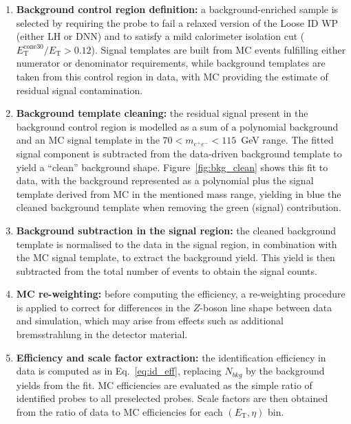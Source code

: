 \begin{enumerate}
    \item \textbf{Background control region definition:} a background-enriched sample is selected by requiring the probe to fail a relaxed version of the Loose ID WP (either LH or DNN) and to satisfy a mild calorimeter isolation cut ($E_{\mathrm{T}}^{\mathrm{cone30}}/E_{\mathrm{T}}>0.12$). Signal templates are built from MC events fulfilling either numerator or denominator requirements, while background templates are taken from this control region in data, with MC providing the estimate of residual signal contamination.

    \item \textbf{Background template cleaning:} the residual signal present in the background control region is modelled as a sum of a polynomial background and an MC signal template in the $70 < m_{e^+e^-} < 115$~GeV range. The fitted signal component is subtracted from the data-driven background template to yield a “clean” background shape. Figure~\ref{fig:bkg_clean} shows this fit to data, with the background represented as a polynomial plus the signal template derived from MC in the mentioned mass range, yielding in blue the cleaned background template when removing the green (signal) contribution.

    \item \textbf{Background subtraction in the signal region:} the cleaned background template is normalised to the data in the signal region, in combination with the MC signal template, to extract the background yield. This yield is then subtracted from the total number of events to obtain the signal counts.

    \item \textbf{MC re-weighting:} before computing the efficiency, a re-weighting procedure is applied to correct for differences in the $Z$-boson line shape between data and simulation, which may arise from effects such as additional bremsstrahlung in the detector material.

    \item \textbf{Efficiency and scale factor extraction:} the identification efficiency in data is computed as in Eq.~\ref{eq:id_eff}, replacing $N_{bkg}$ by the background yields from the fit. MC efficiencies are evaluated as the simple ratio of identified probes to all preselected probes. Scale factors are then obtained from the ratio of data to MC efficiencies for each $(E_{\mathrm{T}},\eta)$ bin.
\end{enumerate}

